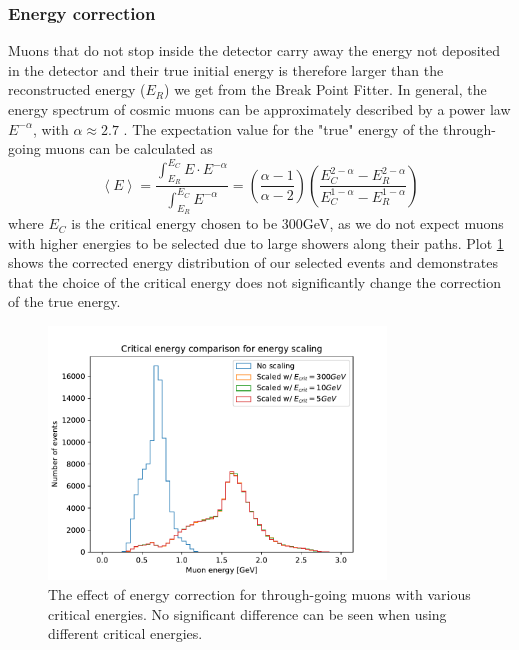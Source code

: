 \documentclass[12pt]{article}
\begin{document}
\subsubsection{Energy correction}
Muons that do not stop inside the detector carry away the energy not deposited in the detector and their true initial energy is therefore larger than the reconstructed energy ($E_R$) we get from the Break Point Fitter. In general, the energy spectrum of cosmic muons can be approximately described by a power law $E^{-\alpha}$, with $\alpha\approx2.7$ \cite{NOVA-doc-51327-v3,rpp2022-rev-cosmic-rays.pdf}. The expectation value for the "true" energy of the through-going muons can be calculated as
\begin{equation}
\left\langle E\right\rangle =\frac{\int^{E_C}_{E_R} E\cdot E^{-\alpha}}{\int^{E_C}_{E_R} E^{-\alpha}}=\left(\frac{\alpha -1}{\alpha -2}\right)\left(\frac{E_C^{2-\alpha}-E_R^{2-\alpha}}{E_C^{1-\alpha}-E_R^{1-\alpha}}\right)
\end{equation}
where $E_C$ is the critical energy chosen to be 300GeV, as we do not expect muons with higher energies to be selected due to large showers along their paths. Plot \ref{figEnergyScaling} shows the corrected energy distribution of our selected events and demonstrates that the choice of the critical energy does not significantly change the correction of the true energy. 

\begin{figure}[hbtp]
\centering
\includegraphics[width=0.8\textwidth]{ECritComparison.pdf}
\caption{The effect of energy correction for through-going muons with various critical energies. No significant difference can be seen when using different critical energies.}
\label{figEnergyScaling}
\end{figure}
\end{document}

